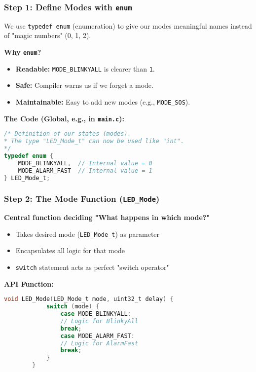 \documentclass{beamer}
\begin{document}
\begin{frame}[fragile]
	\frametitle{Step 1: Define Modes with \texttt{enum}}
	We use \texttt{typedef enum} (enumeration) to give our modes
	meaningful names instead of "magic numbers" (0, 1, 2).
	
	\medskip
	\textbf{Why \texttt{enum}?}
	\begin{itemize}
		\item \textbf{Readable:} \texttt{MODE\_BLINKYALL} is clearer than \texttt{1}.
		\item \textbf{Safe:} Compiler warns us if we forget a mode.
		\item \textbf{Maintainable:} Easy to add new modes (e.g., \texttt{MODE\_SOS}).
	\end{itemize}
	
	\bigskip
	\textbf{The Code (Global, e.g., in \texttt{main.c}):}
	\begin{lstlisting}[language=C, style=mystyle, basicstyle=\scriptsize]
/* Definition of our states (modes).
* The type "LED_Mode_t" can now be used like "int".
*/
typedef enum {
	MODE_BLINKYALL,  // Internal value = 0
	MODE_ALARM_FAST  // Internal value = 1
} LED_Mode_t;
	\end{lstlisting}
\end{frame}

\begin{frame}[fragile]
	\frametitle{Step 2: The Mode Function (\texttt{LED\_Mode})}
	\textbf{Central function deciding "What happens in which mode?"}
	
	\medskip
	\begin{itemize}
		\item Takes desired mode (\texttt{LED\_Mode\_t}) as parameter
		\item Encapsulates all logic for that mode
		\item \texttt{switch} statement acts as perfect "switch operator"
	\end{itemize}
	
	\medskip
	\textbf{API Function:}
	\begin{lstlisting}[language=C, style=mystyle, basicstyle=\footnotesize]
		void LED_Mode(LED_Mode_t mode, uint32_t delay) {
			switch (mode) {
				case MODE_BLINKYALL:
				// Logic for BlinkyAll
				break;
				case MODE_ALARM_FAST:
				// Logic for AlarmFast
				break;
			}
		}
	\end{lstlisting}
\end{frame}
\end{document}
